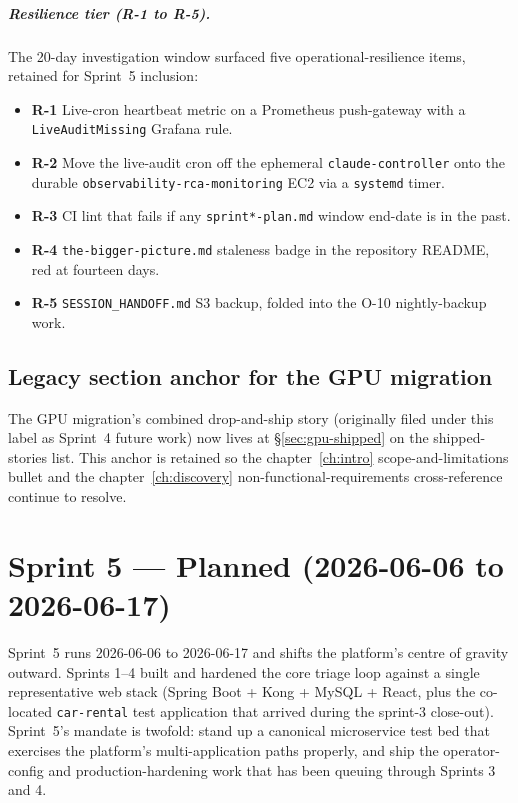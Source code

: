 \documentclass[11pt,a4paper,oneside]{report}
\begin{document}
\paragraph{Resilience tier (R-1 to R-5).}
The 20-day investigation window surfaced five operational-resilience
items, retained for Sprint~5 inclusion:

\begin{itemize}
  \item \textbf{R-1} Live-cron heartbeat metric on a Prometheus
        push-gateway with a \texttt{LiveAuditMissing} Grafana rule.
  \item \textbf{R-2} Move the live-audit cron off the ephemeral
        \texttt{claude-controller} onto the durable
        \texttt{observability-rca-monitoring} EC2 via a
        \texttt{systemd} timer.
  \item \textbf{R-3} CI lint that fails if any
        \texttt{sprint*-plan.md} window end-date is in the past.
  \item \textbf{R-4} \texttt{the-bigger-picture.md} staleness badge in
        the repository README, red at fourteen days.
  \item \textbf{R-5} \texttt{SESSION\_HANDOFF.md} S3 backup, folded
        into the O-10 nightly-backup work.
\end{itemize}

\section{Legacy section anchor for the GPU migration}
\label{sec:gpu-dropped}

The GPU migration's combined drop-and-ship story (originally
filed under this label as Sprint~4 future work) now lives at
\S\ref{sec:gpu-shipped} on the shipped-stories list.  This anchor
is retained so the chapter~\ref{ch:intro} scope-and-limitations
bullet and the chapter~\ref{ch:discovery} non-functional-requirements
cross-reference continue to resolve.

\chapter{Sprint 5 --- Planned (2026-06-06 to 2026-06-17)}
\label{ch:sprint5}

Sprint~5 runs 2026-06-06 to 2026-06-17 and shifts the platform's
centre of gravity outward.  Sprints 1--4 built and hardened the
core triage loop against a single representative web stack
(Spring Boot + Kong + MySQL + React, plus the co-located
\texttt{car-rental} test application that arrived during the
sprint-3 close-out).  Sprint~5's mandate is twofold: stand up a
canonical microservice test bed that exercises the platform's
multi-application paths properly, and ship the operator-config
and production-hardening work that has been queuing through
Sprints 3 and 4.
\end{document}
